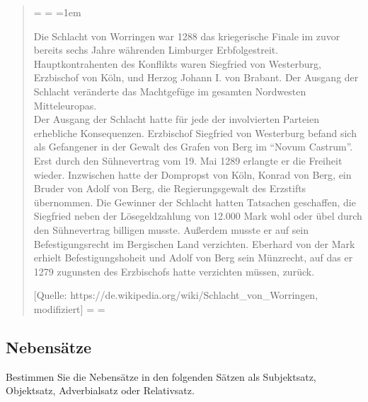 \documentclass[12pt,a4paper,twoside]{article}
\newcommand{\FUBreak}{\clearpage}
\newcommand{\FUBreak}{}
\newenvironment{spread}
{%
  \newdimen\origiwspc%
  \newdimen\origiwstr%
  \origiwspc=\fontdimen2\font%
  \origiwstr=\fontdimen3\font%
  \fontdimen2\font=1em%
  \doublespacing%
}{%
  \fontdimen2\font=\origiwspc%
  \fontdimen3\font=\origiwstr%
}
\begin{document}
\begin{quote}
  \begin{spread}
  Die Schlacht von Worringen war 1288 das kriegerische Finale im zuvor bereits sechs Jahre währenden Limburger Erbfolgestreit.
  Hauptkontrahenten des Konflikts waren Siegfried von Westerburg, Erzbischof von Köln, und Herzog Johann I. von Brabant.
  Der Ausgang der Schlacht veränderte das Machtgefüge im gesamten Nordwesten Mitteleuropas.\\
  Der Ausgang der Schlacht hatte für jede der involvierten Parteien erhebliche Konsequenzen.
  Erzbischof Siegfried von Westerburg befand sich als Gefangener in der Gewalt des Grafen von Berg im "`Novum Castrum"'.
  Erst durch den Sühnevertrag vom 19. Mai 1289 erlangte er die Freiheit wieder.
  Inzwischen hatte der Dompropst von Köln, Konrad von Berg, ein Bruder von Adolf von Berg, die Regierungsgewalt des Erzstifts übernommen.
  Die Gewinner der Schlacht hatten Tatsachen geschaffen, die Siegfried neben der Lösegeldzahlung von 12.000 Mark wohl oder übel durch den Sühnevertrag billigen musste.
  Außerdem musste er auf sein Befestigungsrecht im Bergischen Land verzichten.
  Eberhard von der Mark erhielt Befestigungshoheit und Adolf von Berg sein Münzrecht, auf das er 1279 zugunsten des Erzbischofs hatte verzichten müssen, zurück.

  \footnotesize{[Quelle: https://de.wikipedia.org/wiki/Schlacht\_von\_Worringen, modifiziert]}
  \end{spread}
\end{quote}


\FUBreak

\subsection{Nebensätze}

Bestimmen Sie die Nebensätze in den folgenden Sätzen als Subjektsatz, Objektsatz, Adverbialsatz oder Relativsatz.
\end{document}

